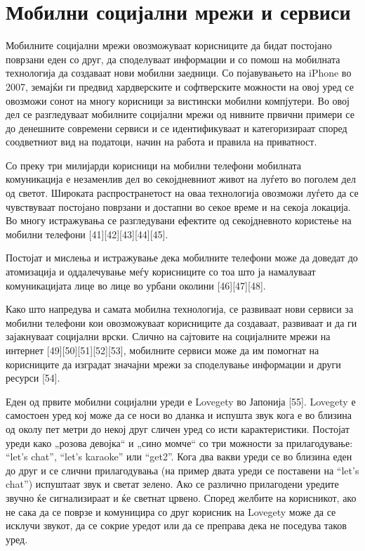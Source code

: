 \chapter{Мобилни социјални мрежи и сервиси}    

Мобилните социјални мрежи овозможуваат корисниците да бидат постојано поврзани
еден со друг, да споделуваат информации и со помош на мобилната технологија да
создаваат нови мобилни заедници. Со појавувањето на iPhone во 2007, земајќи ги
предвид хардверските и софтверските можности на овој уред се овозможи сонот на
многу корисници за вистински мобилни компјутери. Во овој дел се разгледуваат
мобилните социјални мрежи од нивните првични примери се до денешните современи
сервиси и се идентификуваат и категоризираат според соодветниот вид на податоци,
начин на работа и правила на приватност.

Со преку три милијарди корисници на мобилни телефони мобилната комуникација е
незаменлив дел во секојдневниот живот на луѓето во поголем дел од светот.
Широката распространетост на оваа технологија овозможи луѓето да се чувствуваат
постојано поврзани и достапни во секое време и на секоја локација. Во многу
истражувања се разгледувани ефектите од секојдневното користење на мобилни
телефони [41][42][43][44][45].

Постојат и мислења и истражување дека мобилните телефони може да доведат до
атомизација и оддалечување меѓу корисниците со тоа што ја намалуваат
комуникацијата лице во лице во урбани околини [46][47][48].

Како што напредува и самата мобилна технологија, се развиваат нови сервиси за
мобилни телефони кои овозможуваат корисниците да создаваат, развиваат и да ги
зајакнуваат социјални врски. Слично на сајтовите на социјалните мрежи на
интернет [49][50][51][52][53], мобилните сервиси може да им помогнат на
корисниците да изградат значајни мрежи за споделување информации и други ресурси
[54].

Еден од првите мобилни социјални уреди е Lovegety во Јапонија [55]. Lovegety е
самостоен уред кој може да се носи во дланка и испушта звук кога е во близина од
околу пет метри до некој друг сличен уред со исти карактеристики. Постојат уреди
како „розова девојка“ и „сино момче“ со три можности за прилагодување: ``let's
chat'', ``let's karaoke'' или ``get2''. Кога два вакви уреди се во близина еден
до друг и се слични прилагодувања  (на пример двата уреди се поставени на
``let's chat'') испуштаат звук и светат зелено. Ако се различно прилагодени
уредите звучно ќе сигнализираат и ќе светнат црвено. Според желбите на
корисникот, ако не сака да се поврзе и комуницира со друг корисник на Lovegety
може да се исклучи звукот, да се сокрие уредот или да се преправа дека не
поседува таков уред.


